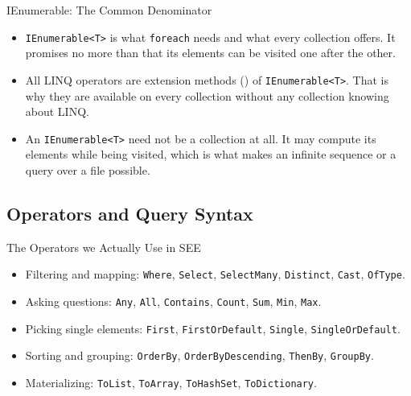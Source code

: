 \begin{frame}{IEnumerable: The Common Denominator}
  \begin{itemize}
    \item \texttt{IEnumerable<T>} is what \texttt{foreach} needs and what every
      collection offers. It promises no more than that its elements can be
      visited one after the other.
    \item All LINQ operators are extension methods
      () of \texttt{IEnumerable<T>}. That is why they
      are available on every collection without any collection knowing about
      LINQ.
    \item An \texttt{IEnumerable<T>} need not be a collection at all. It may
      compute its elements while being visited, which is what makes an infinite
      sequence or a query over a file possible.
  \end{itemize}
  \vspace{4ex}

\end{frame}

\subsection{Operators and Query Syntax}

\begin{frame}{The Operators we Actually Use in SEE}
  \begin{itemize}
    \item Filtering and mapping: \texttt{Where}, \texttt{Select},
      \texttt{SelectMany}, \texttt{Distinct}, \texttt{Cast},
      \texttt{OfType}.
    \item Asking questions: \texttt{Any}, \texttt{All}, \texttt{Contains},
      \texttt{Count}, \texttt{Sum}, \texttt{Min}, \texttt{Max}.
    \item Picking single elements: \texttt{First}, \texttt{FirstOrDefault},
      \texttt{Single}, \texttt{SingleOrDefault}.
    \item Sorting and grouping: \texttt{OrderBy}, \texttt{OrderByDescending},
      \texttt{ThenBy}, \texttt{GroupBy}.
    \item Materializing: \texttt{ToList}, \texttt{ToArray},
      \texttt{ToHashSet}, \texttt{ToDictionary}.
  \end{itemize}
  \vspace{4ex}

\end{frame}


